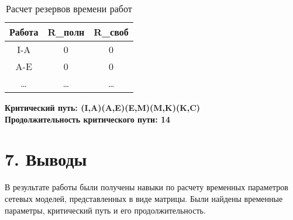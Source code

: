 \documentclass[12pt]{article}
\begin{document}
\begin{table}[H]
    \centering
    \begin{tabular}{|c|c|c|}
        \hline
        Работа & R\_полн & R\_своб \\
        \hline
        I-A & 0 & 0 \\
        \hline
        A-E & 0 & 0 \\
        \hline
        \ldots & \ldots & \ldots \\
        \hline
    \end{tabular}
    \caption{Расчет резервов времени работ}
\end{table}

\textbf{Критический путь: (I,A)(A,E)(E,M)(M,K)(K,C)} \\
\textbf{Продолжительность критического пути: 14}

\section*{7. Выводы}
В результате работы были получены навыки по расчету временных параметров сетевых моделей, представленных в виде матрицы. Были найдены временные параметры, критический путь и его продолжительность.
\end{document}
